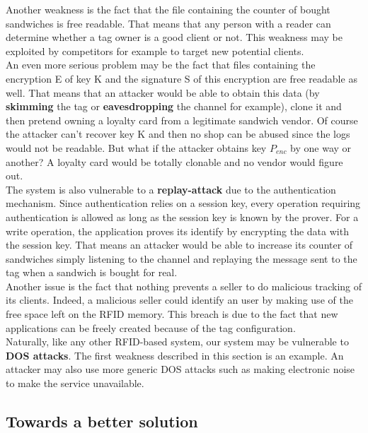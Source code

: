 \documentclass[a4paper,11pt,oneside]{article}
\begin{document}
Another weakness is the fact that the file containing the counter of bought sandwiches is free readable. That means that any person with a reader can determine whether a tag owner is a good client or not. This weakness may be exploited by competitors for example to target new potential clients. \\ 

An even more serious problem may be the fact that files containing the encryption E of key K and the signature S of this encryption are free readable as well. That means that an attacker would be able to obtain this data (by \textbf{skimming} the tag or \textbf{eavesdropping} the channel for example), clone it and then pretend owning a loyalty card from a legitimate sandwich vendor. Of course the attacker can't recover key K and then no shop can be abused since the logs would not be readable. But what if the attacker obtains key $P_{enc}$ by one way or another? A loyalty card would be totally clonable and no vendor would figure out. \\

The system is also vulnerable to a \textbf{replay-attack} due to the authentication mechanism. Since authentication relies on a session key, every operation requiring authentication is allowed as long as the session key is known by the prover. For a write operation, the application proves its identify by encrypting the data with the session key. That means an attacker would be able to increase its counter of sandwiches simply listening to the channel and replaying the message sent to the tag when a sandwich is bought for real. \\

Another issue is the fact that nothing prevents a seller to do malicious
tracking of its clients. Indeed, a malicious seller could identify an user by
making use of the free space left on the RFID memory. This breach is due to the
fact that new applications can be freely created because of the tag
configuration. \\

Naturally, like any other RFID-based system, our system may be vulnerable to \textbf{DOS attacks}. The first weakness described in this section is an example. An attacker may also use more generic DOS attacks such as making electronic noise to make the service unavailable. \\

\newpage
\subsection{Towards a better solution}
\end{document}
